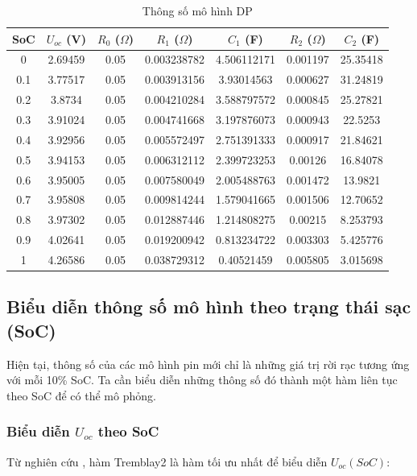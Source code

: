 \documentclass{thesis}
\begin{document}
    \begin{table}[H]
        \centering
        \begin{tabular}{|c|c|c|c|c|c|c|}
            \hline
            \textbf{SoC} & \textbf{$U_{oc}$ (V)} & \textbf{$R_0$ ($\Omega$)} & \textbf{$R_1$ ($\Omega$)} & \textbf{$C_1$ (F)} & \textbf{$R_2$ ($\Omega$)} & \textbf{$C_2$ (F)} \\
            \hline
            0 & 2.69459 & 0.05 & 0.003238782 & 4.506112171 & 0.001197 & 25.35418 \\
            0.1 & 3.77517 & 0.05 & 0.003913156 & 3.93014563 & 0.000627 & 31.24819 \\
            0.2 & 3.8734 & 0.05 & 0.004210284 & 3.588797572 & 0.000845 & 25.27821 \\
            0.3 & 3.91024 & 0.05 & 0.004741668 & 3.197876073 & 0.000943 & 22.5253 \\
            0.4 & 3.92956 & 0.05 & 0.005572497 & 2.751391333 & 0.000917 & 21.84621 \\
            0.5 & 3.94153 & 0.05 & 0.006312112 & 2.399723253 & 0.00126 & 16.84078 \\
            0.6 & 3.95005 & 0.05 & 0.007580049 & 2.005488763 & 0.001472 & 13.9821 \\
            0.7 & 3.95808 & 0.05 & 0.009814244 & 1.579041665 & 0.001506 & 12.70652 \\
            0.8 & 3.97302 & 0.05 & 0.012887446 & 1.214808275 & 0.00215 & 8.253793 \\
            0.9 & 4.02641 & 0.05 & 0.019200942 & 0.813234722 & 0.003303 & 5.425776 \\
            1 & 4.26586 & 0.05 & 0.038729312 & 0.40521459 & 0.005805 & 3.015698 \\
            \hline
        \end{tabular}
        \caption{Thông số mô hình DP}
        \label{tab:dp}
    \end{table}

    \subsection{Biểu diễn thông số mô hình theo trạng thái sạc (SoC)}
    Hiện tại, thông số của các mô hình pin mới chỉ là những giá trị rời rạc tương ứng với mỗi 10\% SoC. Ta cần biểu diễn những thông số đó thành một hàm liên tục theo SoC để có thể mô phỏng.

    \subsubsection{Biểu diễn $U_{oc}$ theo SoC}
    Từ nghiên cứu \cite{bialon2023}, hàm Tremblay2 là hàm tối ưu nhất để biểu diễn \( U_{oc}(SoC) \):
\end{document}
